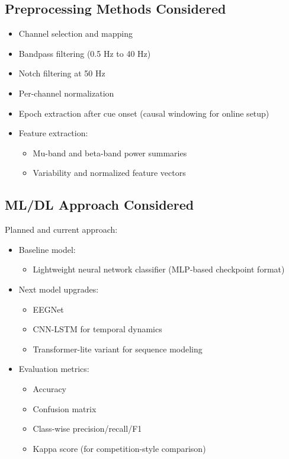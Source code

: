 \documentclass[12pt,a4paper]{article}
\begin{document}
\subsection{Preprocessing Methods Considered}
\begin{itemize}[leftmargin=1.5em]
  \item Channel selection and mapping
  \item Bandpass filtering (0.5 Hz to 40 Hz)
  \item Notch filtering at 50 Hz
  \item Per-channel normalization
  \item Epoch extraction after cue onset (causal windowing for online setup)
  \item Feature extraction:
  \begin{itemize}[leftmargin=1.5em]
    \item Mu-band and beta-band power summaries
    \item Variability and normalized feature vectors
  \end{itemize}
\end{itemize}

\subsection{ML/DL Approach Considered}
Planned and current approach:
\begin{itemize}[leftmargin=1.5em]
  \item Baseline model:
  \begin{itemize}[leftmargin=1.5em]
    \item Lightweight neural network classifier (MLP-based checkpoint format)
  \end{itemize}
  \item Next model upgrades:
  \begin{itemize}[leftmargin=1.5em]
    \item EEGNet
    \item CNN-LSTM for temporal dynamics
    \item Transformer-lite variant for sequence modeling
  \end{itemize}
  \item Evaluation metrics:
  \begin{itemize}[leftmargin=1.5em]
    \item Accuracy
    \item Confusion matrix
    \item Class-wise precision/recall/F1
    \item Kappa score (for competition-style comparison)
  \end{itemize}
\end{itemize}
\end{document}
